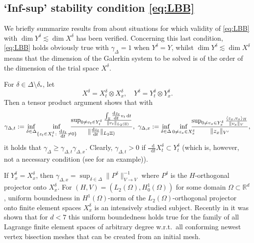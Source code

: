 \documentclass{amsart}
\numberwithin{equation}{section}
\newcommand{\R}{\mathbb R}
\newcommand{\1}{\mathbb 1}
\newcommand*\diff{\mathop{}\!\mathrm{d}}
\newcommand{\be}{\begin{equation}}
\newcommand{\ee}{\end{equation}}
\begin{document}
\subsection{`Inf-sup' stability condition \eqref{eq:LBB}}
We briefly summarize results from \cite{11,249.99,249.992,249.991} about situations for which validity of \eqref{eq:LBB} with $\dim Y^\delta \lesssim \dim X^\delta$ has been verified. Concerning this last condition, \eqref{eq:LBB} holds obviously true with $\gamma_\Delta=1$ when $Y^\delta=Y$, whilst $\dim Y^\delta \lesssim \dim X^\delta$ means that the dimension of the Galerkin system to be solved is of the order of the dimension of the trial space $X^\delta$.
\begin{example} \label{ex:tensor}
For $\delta \in \Delta \setminus \delta_*$, let 
$$
X^\delta = X_t^\delta \otimes X_x^\delta,\quad Y^\delta = Y_t^\delta \otimes Y_x^\delta.
$$
Then a tensor product argument shows that with
\be \label{eq:tensor}
\gamma_{\Delta,t}:=\inf_{\delta \in \Delta} \! \inf_{\{z_t \in X_t^\delta\colon \tfrac{\diff z_t}{\diff t} \neq 0\}}\hspace*{-1.2em}\frac{\sup_{0 \neq v_t \in Y_t^\delta} \frac{\int_\Xi \tfrac{\diff z_t}{\diff t} v_t\diff t}{{\|v_t\|_{L_2(\Xi)}}}}{\|\tfrac{\diff z_t}{\diff t}\|_{L_2\Xi)}}, \,\,
\gamma_{\Delta,x}:=\inf_{\delta \in \Delta}\inf_{0 \neq z_x \in X_x^\delta}\hspace*{-0.8em}\frac{\sup_{0 \neq v_x \in Y_x^\delta} \frac{\langle z_x, v_x\rangle_H}{\|v_x\|_V}}{\|z_x\|_{V'}},
\ee
it holds that $\gamma_{\Delta} \geq \gamma_{\Delta,t} \gamma_{\Delta,x}$.
Clearly, $\gamma_{\Delta,t} >0$ if $\frac{\diff}{\diff t} X_t^\delta \subset Y_t^\delta$ (which is, however, not a necessary condition (see \cite[Prop.~6.1]{11} for an example)).

If $Y_x^\delta=X_x^\delta$, then $\gamma_{\Delta,x}=\sup_{\delta \in \Delta} \|P^\delta\|_{V \rightarrow V}^{-1}$ where $P^\delta$ is the $H$-orthogonal projector onto $X_x^\delta$.
For $(H,V)=(L_2(\Omega),H^1_0(\Omega))$ for some domain $\Omega \subset \R^d$, uniform boundedness in $H^1(\Omega)$-norm of the $L_2(\Omega)$-orthogonal projector onto finite element spaces $X_x^\delta$ is an intensively studied subject.
Recently in \cite{64.596} it was shown that for $d<7$ this uniform boundedness holds true for the family of all Lagrange finite element spaces of arbitrary degree w.r.t.~all conforming newest vertex bisection meshes that can be created from an initial mesh.
\end{example}
\end{document}
